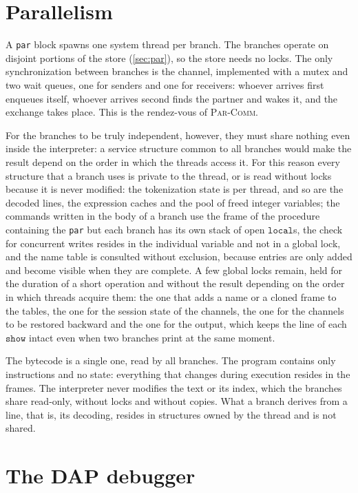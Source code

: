 \section{Parallelism}

A \texttt{par} block spawns one system thread per branch. The branches operate on
disjoint portions of the store (\cref{sec:par}), so the store needs no
locks. The only synchronization between branches is the channel, implemented with a mutex and two wait
queues, one for senders and one for receivers: whoever arrives first
enqueues itself, whoever arrives second finds the partner and wakes it, and the exchange
takes place. This is the rendez-vous of \textsc{Par-Comm}.

For the branches to be truly independent, however, they must share nothing even
inside the interpreter: a service structure common to all branches
would make the result depend on the order in which the threads access it. For
this reason every structure that a branch uses is private to the thread, or is read
without locks because it is never modified: the tokenization state is per
thread, and so are the decoded lines, the expression caches
and the pool of freed integer variables; the commands written in the body of a branch use the frame of the procedure
containing the \texttt{par} but each branch has its own stack of open
$\mathtt{local}$s, the check for concurrent writes resides in the individual variable and
not in a global lock, and the name table is consulted without exclusion,
because entries are only added and become visible when they are complete.
A few global locks remain, held for the duration of a short operation and without
the result depending on the order in which threads acquire them: the one that
adds a name or a cloned frame to the tables, the one for the session
state of the channels, the one for the channels to be restored backward
and the one for the output, which keeps the line of each $\mathtt{show}$ intact even when two
branches print at the same moment.

The bytecode is a single one, read by all branches. The program contains only
instructions and no state: everything that changes during execution resides
in the frames. The interpreter never modifies the text or its index, which the branches
share read-only, without locks and without copies. What a branch
derives from a line, that is, its decoding, resides in structures owned by the
thread and is not shared.

\section{The DAP debugger}
\label{sec:dap}

